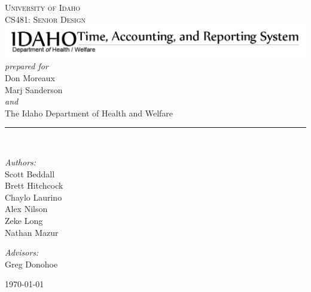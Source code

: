 \documentclass[letterpaper]{article}
\newcommand{\HRule}{\rule{5cm}{0.1mm}}
\begin{document}
\begin{center}



\textsc{\Large University of Idaho}\\[0.2cm]

\textsc{\Large CS481: Senior Design}\\[2cm]


{ \includegraphics[scale=0.45]{logo_huge_inverse.png} }\\[2.0cm]
{ \normalsize \emph{ prepared for}}\\[0.5cm]
{ \normalsize Don Moreaux}\\
{ \normalsize Marj Sanderson}\\[0.5cm]
{ \small \emph{and}}\\[0.5cm]
{ \normalsize The Idaho Department of Health and Welfare}\\[0.5cm]
\HRule \\[3cm]

\begin{minipage}{0.4\textwidth}
\begin{flushleft} \large
\emph{Authors:}\\
Scott Beddall\\
Brett Hitchcock\\
Chaylo Laurino\\
Alex Nilson\\
Zeke Long\\
Nathan Mazur
\end{flushleft}
\end{minipage}
\begin{minipage}{0.4\textwidth}
\begin{flushright} \large
\emph{Advisors:} \\
Greg Donohoe\\
\bigskip
\bigskip
\bigskip
\bigskip
\end{flushright}
\end{minipage}

{\large \today}

\end{center}
\pagebreak
\tableofcontents
\end{document}
